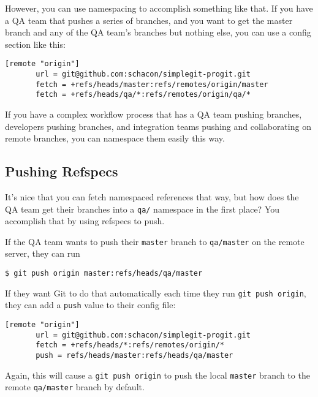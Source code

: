 \documentclass[a4paper]{book}
\begin{document}
However, you can use namespacing to accomplish something like that. If you have a QA team that pushes a series of branches, and you want to get the master branch and any of the QA team's branches but nothing else, you can use a config section like this:

\begin{shaded}\begin{verbatim}
[remote "origin"]
       url = git@github.com:schacon/simplegit-progit.git
       fetch = +refs/heads/master:refs/remotes/origin/master
       fetch = +refs/heads/qa/*:refs/remotes/origin/qa/*
\end{verbatim}\end{shaded}

If you have a complex workflow process that has a QA team pushing branches, developers pushing branches, and integration teams pushing and collaborating on remote branches, you can namespace them easily this way.

\subsection{Pushing Refspecs}\label{pushing-refspecs}

It's nice that you can fetch namespaced references that way, but how does the QA team get their branches into a \texttt{qa/} namespace in the first place? You accomplish that by using refspecs to push.

If the QA team wants to push their \texttt{master} branch to \texttt{qa/master} on the remote server, they can run

\begin{shaded}\begin{verbatim}
$ git push origin master:refs/heads/qa/master
\end{verbatim}\end{shaded}

If they want Git to do that automatically each time they run \texttt{git push origin}, they can add a \texttt{push} value to their config file:

\begin{shaded}\begin{verbatim}
[remote "origin"]
       url = git@github.com:schacon/simplegit-progit.git
       fetch = +refs/heads/*:refs/remotes/origin/*
       push = refs/heads/master:refs/heads/qa/master
\end{verbatim}\end{shaded}

Again, this will cause a \texttt{git push origin} to push the local \texttt{master} branch to the remote \texttt{qa/master} branch by default.
\end{document}
